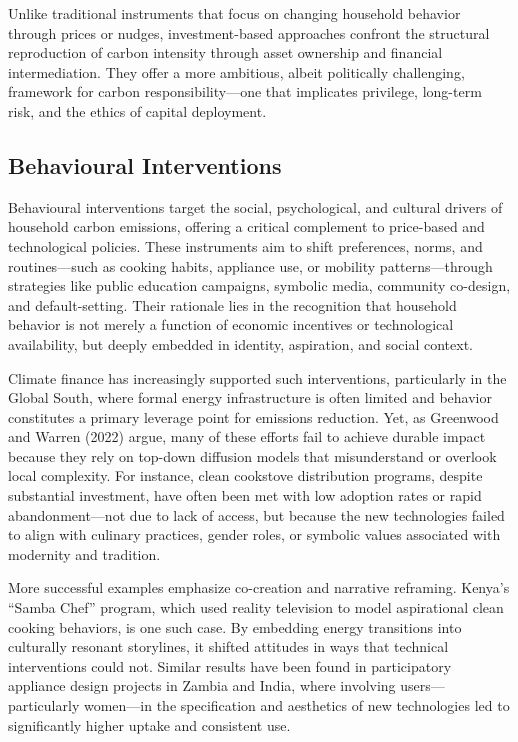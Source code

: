 \documentclass[12pt,a4paper]{article}%
\begin{document}
Unlike traditional instruments that focus on changing household behavior through prices or nudges, investment-based approaches confront the structural reproduction of carbon intensity through asset ownership and financial intermediation. They offer a more ambitious, albeit politically challenging, framework for carbon responsibility—one that implicates privilege, long-term risk, and the ethics of capital deployment.

\subsection{Behavioural Interventions}

Behavioural interventions target the social, psychological, and cultural drivers of household carbon emissions, offering a critical complement to price-based and technological policies. These instruments aim to shift preferences, norms, and routines—such as cooking habits, appliance use, or mobility patterns—through strategies like public education campaigns, symbolic media, community co-design, and default-setting. Their rationale lies in the recognition that household behavior is not merely a function of economic incentives or technological availability, but deeply embedded in identity, aspiration, and social context.

Climate finance has increasingly supported such interventions, particularly in the Global South, where formal energy infrastructure is often limited and behavior constitutes a primary leverage point for emissions reduction. Yet, as Greenwood and Warren (2022) argue, many of these efforts fail to achieve durable impact because they rely on top-down diffusion models that misunderstand or overlook local complexity. For instance, clean cookstove distribution programs, despite substantial investment, have often been met with low adoption rates or rapid abandonment—not due to lack of access, but because the new technologies failed to align with culinary practices, gender roles, or symbolic values associated with modernity and tradition.

More successful examples emphasize co-creation and narrative reframing. Kenya’s “Samba Chef” program, which used reality television to model aspirational clean cooking behaviors, is one such case. By embedding energy transitions into culturally resonant storylines, it shifted attitudes in ways that technical interventions could not. Similar results have been found in participatory appliance design projects in Zambia and India, where involving users—particularly women—in the specification and aesthetics of new technologies led to significantly higher uptake and consistent use.
\end{document}
